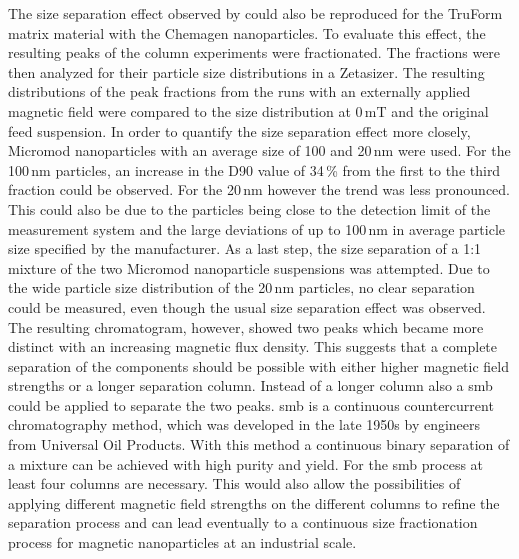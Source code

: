 The size separation effect observed by \cite{AndreMaster} could also be reproduced for the TruForm matrix material with the Chemagen nanoparticles. To evaluate this effect, the resulting peaks of the column experiments were fractionated. The fractions were then analyzed for their particle size distributions in a Zetasizer. The resulting distributions of the peak fractions from the runs with an externally applied magnetic field were compared to the size distribution at 0\,mT and the original feed suspension. In order to quantify the size separation effect more closely, Micromod nanoparticles with an average size of 100 and 20\,nm were used. For the 100\,nm particles, an increase in the D90 value of 34\,\% from the first to the third fraction could be observed. For the 20\,nm however the trend was less pronounced. This could also be due to the particles being close to the detection limit of the measurement system and the large deviations of up to 100\,nm in average particle size specified by the manufacturer. As a last step, the size separation of a 1:1 mixture of the two Micromod nanoparticle suspensions was attempted. Due to the wide particle size distribution of the 20\,nm particles, no clear separation could be measured, even though the usual size separation effect was observed. The resulting chromatogram, however, showed two peaks which became more distinct with an increasing magnetic flux density. This suggests that a complete separation of the components should be possible with either higher magnetic field strengths or a longer separation column. Instead of a longer column also a \gls{smb} could be applied to separate the two peaks. \Gls{smb} is a continuous countercurrent chromatography method, which was developed in the late 1950s by engineers from Universal Oil Products\cite{broughton1961continuous,carson1962rotary}. With this method a continuous binary separation of a mixture can be achieved with high purity and yield. For the \gls{smb} process at least four columns are necessary. This would also allow the possibilities of applying different magnetic field strengths on the different columns to refine the separation process and can lead eventually to a continuous size fractionation process for magnetic nanoparticles at an industrial scale.  